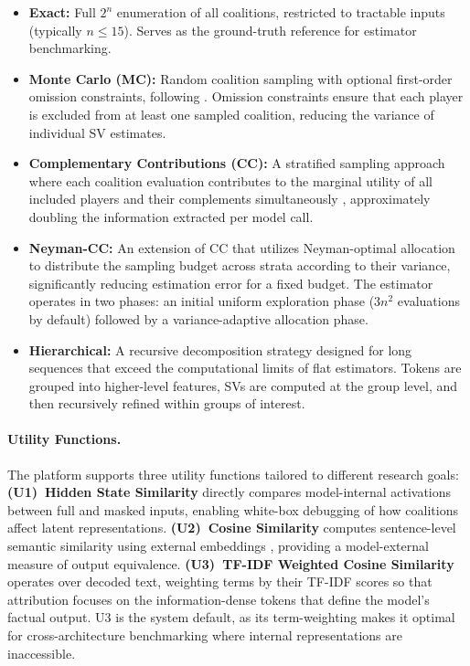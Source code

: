 \documentclass[11pt]{article}
\begin{document}
\begin{itemize}[itemsep=1pt]
    \item \textbf{Exact:} Full $2^n$ enumeration of all coalitions, restricted to tractable inputs (typically $n \le 15$). Serves as the ground-truth reference for estimator benchmarking.
    \item \textbf{Monte Carlo (MC):} Random coalition sampling with optional first-order omission constraints, following \citet{goldshmidt2024tokenshapinterpretinglargelanguage}. Omission constraints ensure that each player is excluded from at least one sampled coalition, reducing the variance of individual SV estimates.
    \item \textbf{Complementary Contributions (CC):} A stratified sampling approach where each coalition evaluation contributes to the marginal utility of all included players and their complements simultaneously \citep{shapleyapproximations}, approximately doubling the information extracted per model call.
    \item \textbf{Neyman-CC:} An extension of CC that utilizes Neyman-optimal allocation~\citep{nayman} to distribute the sampling budget across strata according to their variance, significantly reducing estimation error for a fixed budget. The estimator operates in two phases: an initial uniform exploration phase ($3n^2$ evaluations by default) followed by a variance-adaptive allocation phase.
    \item \textbf{Hierarchical:} A recursive decomposition strategy designed for long sequences that exceed the computational limits of flat estimators. Tokens are grouped into higher-level features, SVs are computed at the group level, and then recursively refined within groups of interest.
\end{itemize}

\paragraph{Utility Functions.}
The platform supports three utility functions tailored to different research goals:
\textbf{(U1)~Hidden State Similarity} directly compares model-internal activations between full and masked inputs, enabling white-box debugging of how coalitions affect latent representations.
\textbf{(U2)~Cosine Similarity} computes sentence-level semantic similarity using external embeddings \citep{reimers}, providing a model-external measure of output equivalence.
\textbf{(U3)~TF-IDF Weighted Cosine Similarity} operates over decoded text, weighting terms by their TF-IDF scores so that attribution focuses on the information-dense tokens that define the model's factual output. U3 is the system default, as its term-weighting makes it optimal for cross-architecture benchmarking where internal representations are inaccessible.
\end{document}
